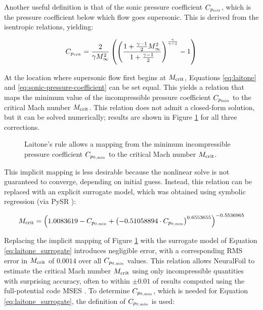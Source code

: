 \documentclass[conf]{new-aiaa}
\begin{document}
    Another useful definition is that of the sonic pressure coefficient $C_{p_{\rm crit}}$, which is the pressure coefficient below which flow goes supersonic. This is derived from the isentropic relations, yielding:

    \begin{equation}
        C_{p_{\rm crit}} = \frac{2}{\gamma M_\infty^{2}} \left(
        \left(
        \frac{1 + \frac{\gamma - 1}{2} M_\infty^{2}}{1 + \frac{\gamma - 1}{2}}
        \right)^{\frac{\gamma}{\gamma - 1}}
        - 1
        \right)
        \label{eq:sonic-pressure-coefficient}
    \end{equation}

    At the location where supersonic flow first begins at $M_{\rm crit}$, Equations \ref{eq:laitone} and \ref{eq:sonic-pressure-coefficient} can be set equal. This yields a relation that maps the minimum value of the incompressible pressure coefficient $C_{p_{\rm min}}$ to the critical Mach number $M_{\rm crit}$. This relation does not admit a closed-form solution, but it can be solved numerically; results are shown in Figure \ref{fig:compressibility_corrections} for all three corrections.

    \begin{figure}[h]
        \centering
        
        \caption{Laitone's rule allows a mapping from the minimum incompressible pressure coefficient $C_{p_{0,\rm min}}$ to the critical Mach number $M_{\rm crit}$.}
        \label{fig:compressibility_corrections}
    \end{figure}

    This implicit mapping is less desirable because the nonlinear solve is not guaranteed to converge, depending on initial guess. Instead, this relation can be replaced with an explicit surrogate model, which was obtained using symbolic regression (via PySR \cite{cranmer_interpretable_2023}):

    \begin{equation}
        M_{\rm crit} = \left(
        1.0083619
        - C_{p_{0,\rm min}}
        + \left(-0.51058894 \cdot C_{p_{0,\rm min}} \right)^{0.6553655}
        \right)^{-0.5536965}
        \label{eq:laitone_surrogate}
    \end{equation}

    Replacing the implicit mapping of Figure \ref{fig:compressibility_corrections} with the surrogate model of Equation \ref{eq:laitone_surrogate} introduces negligible error, with a corresponding RMS error in $M_{\rm crit}$ of $0.0014$ over all $C_{p_{0,\rm min}}$ values. This relation allows NeuralFoil to estimate the critical Mach number $M_{\rm crit}$ using only incompressible quantities with surprising accuracy, often to within $\pm 0.01$ of results computed using the full-potential code MSES \cite{mses}. To determine $C_{p_{0,\rm min}}$, which is needed for Equation \ref{eq:laitone_surrogate}, the definition of $C_{p_{0,\rm min}}$ is used:
\end{document}
